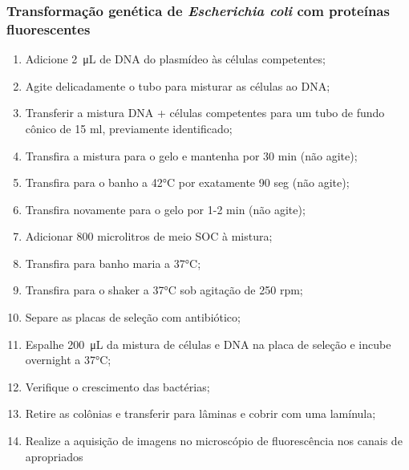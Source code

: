 \subsubsection{Transformação genética de \textit{Escherichia coli} com proteínas
fluorescentes}
\begin{enumerate} %
    \item Adicione \qty{2}{\micro\liter} de DNA do plasmídeo às células competentes;
    \item Agite delicadamente o tubo para misturar as células ao DNA;
    \item Transferir a mistura DNA + células competentes para um tubo de fundo cônico de 15 ml, previamente identificado;
    \item Transfira a mistura para o gelo e mantenha por 30 min (não agite);
    \item Transfira para o banho a 42°C por exatamente 90 seg (não agite);
    \item Transfira novamente para o gelo por 1-2 min (não agite);
    \item Adicionar 800 microlitros de meio SOC à mistura;
    \item Transfira para banho maria a 37°C;
    \item Transfira para o shaker a 37°C sob agitação de 250 rpm;
    \item Separe as placas de seleção com antibiótico;
    \item Espalhe \qty{200}{\micro\liter} da mistura de células e DNA na placa de seleção e incube overnight a 37°C;
    \item Verifique o crescimento das bactérias;
    \item Retire as colônias e transferir para lâminas e cobrir com uma lamínula;
    \item Realize a aquisição de imagens no microscópio de fluorescência nos canais de apropriados
\end{enumerate}

